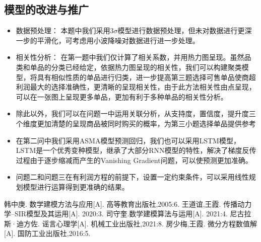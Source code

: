 \documentclass[withoutpreface,bwprint]{cumcmthesis}
\begin{document}
\subsection{模型的改进与推广}
\begin{itemize}
	\item {\normalsize 数据预处理： 本题中我们采用$3\sigma $模型进行数据预处理，但未对数据进行更深一步的平滑化，可考虑用小波降噪对数据进行进一步处理。}
	\item {\normalsize 相关性分析： 在第一题中我们仅计算了相关系数，并用热力图呈现。虽然品类和单品的分类已经给定，依据热力图呈现的相关性，我们可以构建聚类模型，将具有相似性质的单品进行归类，进一步提高第三题选择可售单品使商超利润最大的选择准确性，更清晰的呈现相关性，由于此方法相关性由点呈现，可以在一张图上呈现更多单品，更加有利于多种单品的相关性分析。}
	\item {\normalsize 除此以外，我们可以在问题一中运用关联分析，从支持度，置信度，提升度三个维度更加清楚的呈现商品被同时购买的概率，为第三小题选择单品提供参考}
	\item 在第二问中我们采用ASMA模型预测回归，我们也可以采用LSTM模型，LSTM是一个优秀变种模型，继承了大部分RNN模型的特性，解决了梯度反传过程由于逐步缩减而产生的Vanishing Gradient问题，可以使预测更加准确。
	\item 问题二和问题三在有利润方程的前提下，设置一定约束条件，可以采用线性规划模型进行运算得到更准确的结果。
\end{itemize}
\begin{thebibliography}{99}  
	

	韩中庚. 数学建模方法与应用[A]. 高等教育出版社,2005:6.
	王道谊,王霞. 传播动力学--SIR模型及其运用[A]. 2020:3.
	司守奎.数学建模算法与运用[A]. 2021:4.
	尼古拉斯·迪方佐. 谣言心理学[A]. 机械工业出版社,2021:8.
	房少梅,王霞. 微分方程数值解[A]. 国防工业出版社,2016:5.
\end{thebibliography}
\end{document}
